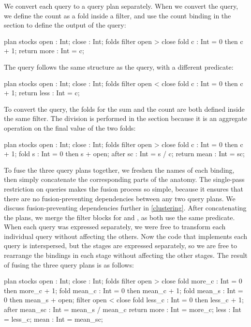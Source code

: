 We convert each query to a query plan separately.
When we convert the \IcC@more@ query, we define the count as a fold inside a filter, and use the count binding in the \IcC@return@ section to define the output of the query:

\begin{icicle-core}
plan stocks { open : Int; close : Int; }
folds {
  filter open > close {
    fold c    : Int = 0 then c + 1; } }
return { more : Int = c; }
\end{icicle-core}

The \IcC@less@ query follows the same structure as the \IcC@more@ query, with a different predicate:

\begin{icicle-core}
plan stocks { open : Int; close : Int; }
folds {
  filter open < close {
    fold c    : Int = 0 then c + 1; } }
return { less : Int = c; }
\end{icicle-core}

To convert the \IcC@mean@ query, the folds for the sum and the count are both defined inside the same filter.
The division is performed in the \IcC@after@ section because it is an aggregate operation on the final value of the two folds:

\begin{icicle-core}
plan stocks { open : Int; close : Int; }
folds {
  filter open > close {
    fold c    : Int = 0 then c + 1;
    fold s    : Int = 0 then s + open; } }
after  { sc   : Int = s / c; }
return { mean : Int = sc; }
\end{icicle-core}

To fuse the three query plans together, we freshen the names of each binding, then simply concatenate the corresponding parts of the anatomy.
The single-pass restriction on queries makes the fusion process so simple, because it ensures that there are no fusion-preventing dependencies between any two query plans. 
We discuss fusion-preventing dependencies further in \cref{clustering}.
After concatenating the plans, we merge the filter blocks for \IcC@more@ and \IcC@mean@, as both use the same predicate.
When each query was expressed separately, we were free to transform each individual query without affecting the others.
Now the code that implements each query is interspersed, but the stages are expressed separately, so we are free to rearrange the bindings in each stage without affecting the other stages.
The result of fusing the three query plans is as follows:

\begin{icicle-core}
plan stocks { open : Int; close : Int; }
folds {
  filter open > close {
    fold more_c  : Int = 0 then more_c + 1;
    fold mean_c  : Int = 0 then mean_c + 1;
    fold mean_s  : Int = 0 then mean_s + open; }
  filter open < close {
    fold less_c  : Int = 0 then less_c + 1; } }
after  { mean_sc : Int = mean_s / mean_c }
return { more    : Int = more_c;
         less    : Int = less_c;
         mean    : Int = mean_sc; }
\end{icicle-core}


